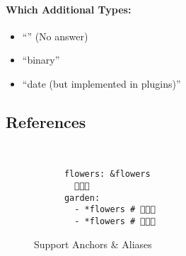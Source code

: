 \documentclass[a4paper, svgnames, 12pt]{article}
\begin{document}
\paragraph{Which Additional Types:}
\begin{itemize}
  \item “” (No answer)
  \item “binary”
  \item “date (but implemented in plugins)”
\end{itemize}

\subsection{References}

\begin{figure}[H]
  \begin{minipage}[t]{0.48\textwidth}
    \vspace{0pt}
    \begin{bchart}[max=9, width=0.85\textwidth]
    \end{bchart}
  \end{minipage}
  \begin{minipage}[t]{0pt}~\end{minipage}
  \begin{minipage}[t]{0.48\textwidth}
    \vspace{0pt}
    \begin{verbatim}
      flowers: &flowers
        🌳🌸🌼
      garden:
        - *flowers # 🌳🌸🌼
        - *flowers # 🌳🌸🌼
    \end{verbatim}
  \end{minipage}
  \caption{Support Anchors \& Aliases}
\end{figure}


\end{document}
